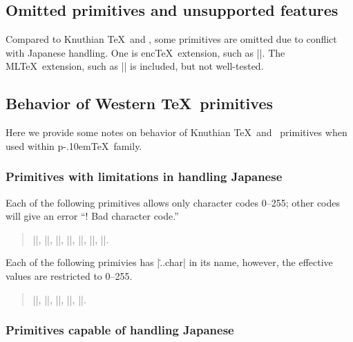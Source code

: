 \documentclass[a4paper,11pt]{article}
\def\pTeX{p\kern-.10em\TeX}
\begin{document}
\subsection{Omitted primitives and unsupported features}

Compared to Knuthian \TeX\ and \eTeX,
some primitives are omitted due to conflict with Japanese handling.
One is enc\TeX\ extension, such as |\mubyte|.
The ML\TeX\ extension, such as |\charsubdef| is included, but not well-tested.


\subsection{Behavior of Western \TeX\ primitives}

Here we provide some notes on behavior of Knuthian \TeX\ and \eTeX\ primitives
when used within \pTeX\ family.

\subsubsection{Primitives with limitations in handling Japanese}

Each of the following primitives allows only character codes 0--255;
other codes will give an error ``! Bad character code.''
\begin{quote}
 |\catcode|,
 |\sfcode|,
 |\mathcode|,
 |\delcode|,
 |\mathchardef|,
 |\lccode|,
 |\uccode|.
\end{quote}

Each of the following primivies has |\...char| in its name,
however, the effective values are restricted to 0--255.
\begin{quote}
 |\endlinechar|,
 |\newlinechar|,
 |\escapechar|,
 ||,
 ||.
\end{quote}

\subsubsection{Primitives capable of handling Japanese}
\end{document}
